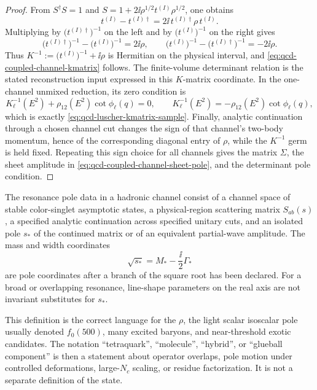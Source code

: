 \begin{proof}
From \(S^\dagger S=1\) and
\(S=1+2\ii\rho^{1/2}t^{(I)}\rho^{1/2}\), one obtains
\[
  t^{(I)}-t^{(I)\dagger}
  =
  2\ii\,t^{(I)\dagger}\rho\,t^{(I)}.
\]
Multiplying by \(\bigl(t^{(I)\dagger}\bigr)^{-1}\) on the left and by
\(\bigl(t^{(I)}\bigr)^{-1}\) on the right gives
\[
  \bigl(t^{(I)\dagger}\bigr)^{-1}
  -
  \bigl(t^{(I)}\bigr)^{-1}
  =
  2\ii\rho,
  \qquad
  \bigl(t^{(I)}\bigr)^{-1}
  -
  \bigl(t^{(I)\dagger}\bigr)^{-1}
  =
  -2\ii\rho .
\]
Thus \(K^{-1}:=\bigl(t^{(I)}\bigr)^{-1}+\ii\rho\) is Hermitian on the
physical interval, and \eqref{eq:qcd-coupled-channel-kmatrix} follows.  The
finite-volume determinant relation is the stated reconstruction input
expressed in this \(K\)-matrix coordinate.  In the one-channel unmixed
reduction, its zero condition is
\[
  K_\ell^{-1}(E^2)+\rho_{12}(E^2)\cot\phi_\ell(q)=0,
  \qquad
  K_\ell^{-1}(E^2)
  =
  -\rho_{12}(E^2)\cot\phi_\ell(q),
\]
which is exactly \eqref{eq:qcd-luscher-kmatrix-sample}.  Finally, analytic
continuation through a chosen channel cut changes the sign of that channel's
two-body momentum, hence of the corresponding diagonal entry of \(\rho\),
while the \(K^{-1}\) germ is held fixed.  Repeating this sign choice for all
channels gives the matrix \(\Sigma\), the sheet amplitude in
\eqref{eq:qcd-coupled-channel-sheet-pole}, and the determinant pole
condition.
\end{proof}

\begin{definition}
\label{def:qcd-resonance-pole-data}
The resonance pole data in a hadronic channel consist of a channel space of stable
color-singlet asymptotic states, a physical-region scattering matrix
\(S_{ab}(s)\), a specified analytic continuation across specified unitary
cuts, and an isolated pole \(s_\ast\) of the continued matrix or of an
equivalent partial-wave amplitude.  The mass and width coordinates
\[
  \sqrt{s_\ast}=M_\ast-\frac{\ii}{2}\Gamma_\ast
\]
are pole coordinates after a branch of the square root has been declared.
For a broad or overlapping resonance, line-shape parameters on the real axis
are not invariant substitutes for \(s_\ast\).
\end{definition}

This definition is the correct language for the \(\rho\), the light scalar
isoscalar pole usually denoted \(f_0(500)\), many excited baryons, and
near-threshold exotic candidates.  The notation ``tetraquark'', ``molecule'',
``hybrid'', or ``glueball component'' is then a statement about operator
overlaps, pole motion under controlled deformations, large-\(N_c\) scaling,
or residue factorization.  It is not a separate definition of the state.

